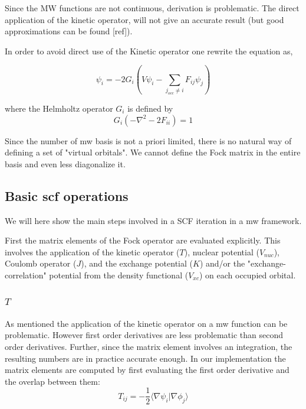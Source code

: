 \documentclass{article}
\begin{document}
Since the  MW functions are not continuous, derivation is problematic. The direct application of the kinetic operator, will not give an accurate result (but good approximations can be found [ref]).

In order to avoid direct use of the Kinetic operator one rewrite the equation as, 

\begin{equation}
\psi_i = -2 G_{i}(V\psi_i - \sum_{j_{occ} \ne i} F_{ij} \psi_j)
\end{equation}

where the Helmholtz operator $G_{i}$ is defined by
\begin{equation}
G_{i}(-\nabla^2 - 2 F_{ii} )=1
\end{equation}

Since the number of mw basis is not a priori limited, there is no natural way of defining a set of "virtual orbitals". We cannot define the Fock matrix in the entire basis and even less diagonalize it.


\subsection{Basic scf operations} %

We will here show the main steps involved in a SCF iteration in a mw framework.

First the matrix elements of the Fock operator are evaluated explicitly. This involves the application of the kinetic operator ($T$), nuclear  potential ($V_{nuc}$), Coulomb operator ($J$), and  the exchange potential ($K$) and/or the "exchange-correlation" potential from the density functional ($V_{xc}$) on each occupied orbital.

\subsubsection{$T$}
As mentioned the application of the kinetic operator on a mw function can be problematic. However first order derivatives are less problematic than second order derivatives. Further, since the matrix element involves an integration, the resulting numbers are in practice accurate enough. 
In our implementation the matrix elements are computed by first evaluating the first order derivative and the overlap between them:
\begin{equation}
  T_{ij} = -\frac{1}{2} \langle \nabla \psi_i |\nabla {\phi_j}\rangle
\end{equation}
\end{document}
